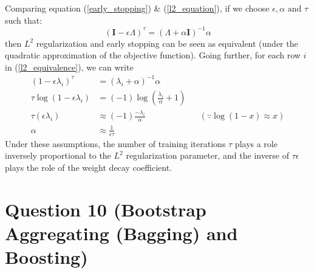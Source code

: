 \documentclass[fleqn]{article}
\begin{document}
Comparing equation (\ref{early_stopping}) \& (\ref{l2_equation}), if we choose $\epsilon, \alpha \text{ and }\tau$ such that:
\begin{equation} \label{l2_equivalence}
	(\bm{I} - \epsilon \Lambda)^{\tau} = (\Lambda + \alpha \bm{I})^{-1} \alpha
\end{equation}
then $L^2$ regularization and early stopping can be seen as equivalent (under the quadratic approximation of the objective function). Going further, for each row $i$ in (\ref{l2_equivalence}), we can write
\begin{align*}
	(1 - \epsilon \lambda_i)^{\tau} &= (\lambda_i + \alpha)^{-1} \alpha\\
	\tau \log (1 - \epsilon \lambda_i) &= (-1) \log (\frac{\lambda_i}{\alpha} + 1 ) \\
	\tau (\epsilon \lambda_i) &\approx (-1) \frac{-\lambda_i}{\alpha} && (\because \log (1-x) \approx x ) \\
	\alpha &\approx \frac{1}{\epsilon \tau}
\end{align*}
Under these assumptions, the number of training iterations $\tau$ plays a role inversely proportional to the $L^2$ regularization parameter, and the inverse of $\tau \epsilon$ plays the role of the weight decay coefficient.

\section*{Question 10 (Bootstrap Aggregating (Bagging) and Boosting)}
\end{document}
